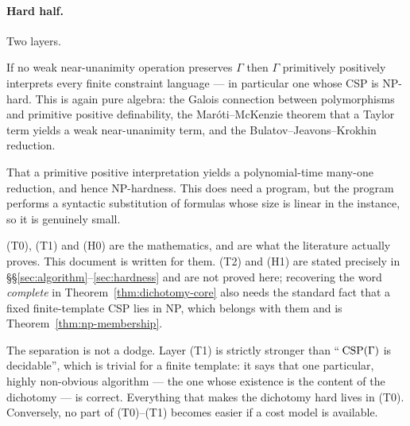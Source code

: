 \paragraph{Hard half.} Two layers.

\begin{description}\tightlist
\item[\textup{(H0)} \emph{The algebraic core.}] If no weak near-unanimity
  operation preserves $\Gamma$ then $\Gamma$ primitively positively interprets
  every finite constraint language --- in particular one whose CSP is
  \textup{NP}-hard. This is again pure algebra: the Galois connection between
  polymorphisms and primitive positive definability, the Maróti--McKenzie
  theorem that a Taylor term yields a weak near-unanimity term, and the
  Bulatov--Jeavons--Krokhin reduction.
\item[\textup{(H1)} \emph{The complexity wrapper.}] That a primitive positive
  interpretation yields a polynomial-time many-one reduction, and hence
  \textup{NP}-hardness. This does need a program, but the program performs a
  syntactic substitution of formulas whose size is linear in the instance, so
  it is genuinely small.
\end{description}

\textup{(T0)}, \textup{(T1)} and \textup{(H0)} are the mathematics, and are
what the literature actually proves. This document is written for them.
\textup{(T2)} and \textup{(H1)} are stated precisely in
\S\S\ref{sec:algorithm}--\ref{sec:hardness} and are not proved here; recovering
the word \emph{complete} in Theorem~\ref{thm:dichotomy-core} also needs the
standard fact that a fixed finite-template CSP lies in \textup{NP}, which
belongs with them and is Theorem~\ref{thm:np-membership}.

\begin{remark}\label{rem:layers-not-a-dodge}
The separation is not a dodge. Layer \textup{(T1)} is strictly stronger than
``\,$\operatorname{CSP}(\Gamma)$ is decidable'', which is trivial for a finite template: it
says that one particular, highly non-obvious algorithm --- the one whose
existence is the content of the dichotomy --- is correct. Everything that makes
the dichotomy hard lives in \textup{(T0)}. Conversely, no part of
\textup{(T0)}--\textup{(T1)} becomes easier if a cost model is available.
\end{remark}
